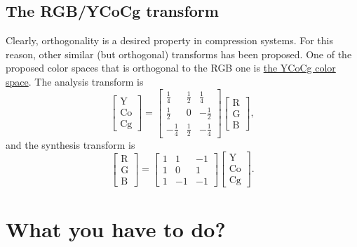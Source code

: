 \subsection{The RGB/YCoCg transform}
Clearly, orthogonality is a desired property in compression
systems. For this reason, other similar (but orthogonal) transforms
has been proposed. One of the proposed color spaces that is orthogonal
to the RGB one is \href{https://en.wikipedia.org/wiki/YCoCg}{the YCoCg
  color space}. The analysis transform is
\begin{equation}
  \begin{bmatrix}
    \text{Y} \\
    \text{Co} \\
    \text{Cg}
  \end{bmatrix}
  =
  \begin{bmatrix}
    \frac{1}{4} &  \frac{1}{2}  &  \frac{1}{4} \\ 
    \frac{1}{2} &            0  & -\frac{1}{2} \\
    -\frac{1}{4} &  \frac{1}{2}  & -\frac{1}{4}
  \end{bmatrix}
  \begin{bmatrix}
    \text{R} \\
    \text{G} \\
    \text{B}
  \end{bmatrix},
\end{equation}
and the synthesis transform is
\begin{equation}
  \begin{bmatrix}
    \text{R} \\
    \text{G} \\
    \text{B}
  \end{bmatrix}
  =
  \begin{bmatrix}
    1  &  1  & -1 \\ 
    1  &  0  &  1 \\ 
    1  & -1  & -1
  \end{bmatrix}
  \begin{bmatrix}
    \text{Y} \\
    \text{Co} \\
    \text{Cg}
  \end{bmatrix}.
\end{equation}

\section{What you have to do?}

